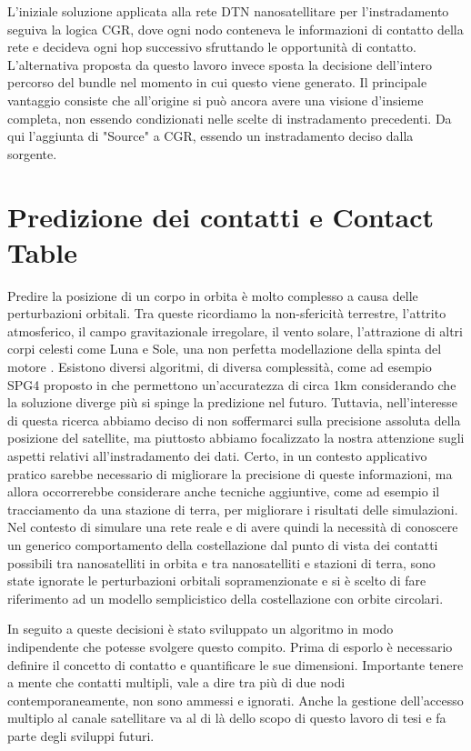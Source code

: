 \documentclass[12pt,a4paper,oneside]{book}
\begin{document}
		L'iniziale soluzione applicata alla rete DTN nanosatellitare per l'instradamento seguiva la logica CGR, dove ogni nodo conteneva le informazioni di contatto della rete e decideva ogni hop successivo sfruttando le opportunità di contatto. L'alternativa proposta da questo lavoro invece sposta la decisione dell'intero percorso del bundle nel momento in cui questo viene generato. Il principale vantaggio consiste che all'origine si può ancora avere una visione d'insieme completa, non essendo condizionati nelle scelte di instradamento precedenti. Da qui l'aggiunta di "Source" a CGR, essendo un instradamento deciso dalla sorgente. 
		
		\section{Predizione dei contatti e Contact Table}
		Predire la posizione di un corpo in orbita è molto complesso a causa delle perturbazioni orbitali. Tra queste ricordiamo la non-sfericità terrestre, l'attrito atmosferico, il campo gravitazionale irregolare, il vento solare, l'attrazione di altri corpi celesti come Luna e Sole, una non perfetta modellazione della spinta del motore \cite{gilmore2009predicting}. Esistono diversi algoritmi, di diversa complessità, come ad esempio SPG4 proposto in \cite{gilmore2009predicting} che permettono un'accuratezza di circa 1km considerando che la soluzione diverge più si spinge la predizione nel futuro. Tuttavia, nell'interesse di questa ricerca abbiamo deciso di non soffermarci sulla precisione assoluta della posizione del satellite, ma piuttosto abbiamo focalizzato la nostra attenzione sugli aspetti relativi all'instradamento dei dati. Certo, in un contesto applicativo pratico sarebbe necessario di migliorare la precisione di queste informazioni, ma allora occorrerebbe considerare anche tecniche aggiuntive, come ad esempio il tracciamento da una stazione di terra, per migliorare i risultati delle simulazioni. Nel contesto di simulare una rete reale e di avere quindi la necessità di conoscere un generico comportamento della costellazione dal punto di vista dei contatti possibili tra nanosatelliti in orbita e tra nanosatelliti e stazioni di terra, sono state ignorate le perturbazioni orbitali sopramenzionate e si è scelto di fare riferimento ad un modello semplicistico della costellazione con orbite circolari. 
		
		In seguito a queste decisioni è stato sviluppato un algoritmo in modo indipendente che potesse svolgere questo compito. Prima di esporlo è necessario definire il concetto di contatto e quantificare le sue dimensioni. Importante tenere a mente che contatti multipli, vale a dire tra più di due nodi contemporaneamente, non sono ammessi e ignorati. Anche la gestione dell'accesso multiplo al canale satellitare va al di là dello scopo di questo lavoro di tesi e  fa parte degli sviluppi futuri.
\end{document}
